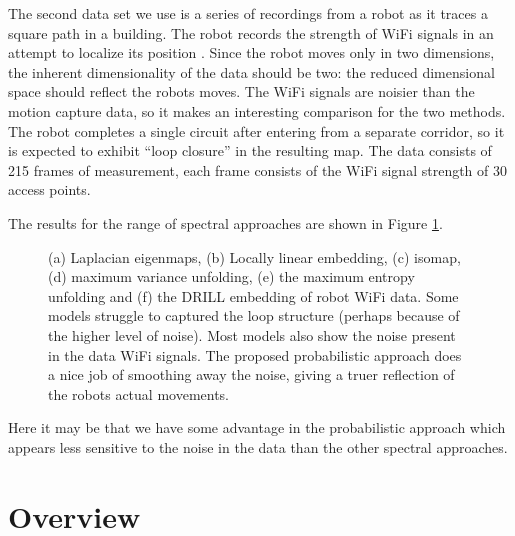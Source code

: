 The second data set we use is a series of recordings from a robot as
it traces a square path in a building. The robot records the strength
of WiFi signals in an attempt to localize its position \citep[see][for
an application]{Ferris:wifi07}. Since the robot moves only in two
dimensions, the inherent dimensionality of the data should be two: the
reduced dimensional space should reflect the robots moves. The WiFi
signals are noisier than the motion capture data, so it makes an
interesting comparison for the two methods. The robot completes a
single circuit after entering from a separate corridor, so it is
expected to exhibit ``loop closure'' in the resulting map. The data
consists of 215 frames of measurement, each frame consists of the WiFi
signal strength of 30 access points.

The results for the range of spectral approaches are shown in Figure
\ref{fig:embedRobot}.
\begin{figure}
  \hfill
  \hfill
  \hfill
  \hfill
  \hfill

\caption{(a) Laplacian eigenmaps, (b) Locally linear embedding, (c) isomap, (d) maximum variance unfolding, (e) the maximum entropy unfolding and (f) the DRILL embedding of robot WiFi data. Some models struggle to captured the loop structure (perhaps because of the higher level of noise). Most models also show the noise present in the data WiFi signals. The proposed probabilistic approach does a nice job of smoothing away the noise, giving a truer reflection of the robots actual movements.}\label{fig:embedRobot}
\end{figure}
Here it may be that we have some advantage in the probabilistic
approach which appears less sensitive to the noise in the data than
the other spectral approaches.

\section{Overview}

